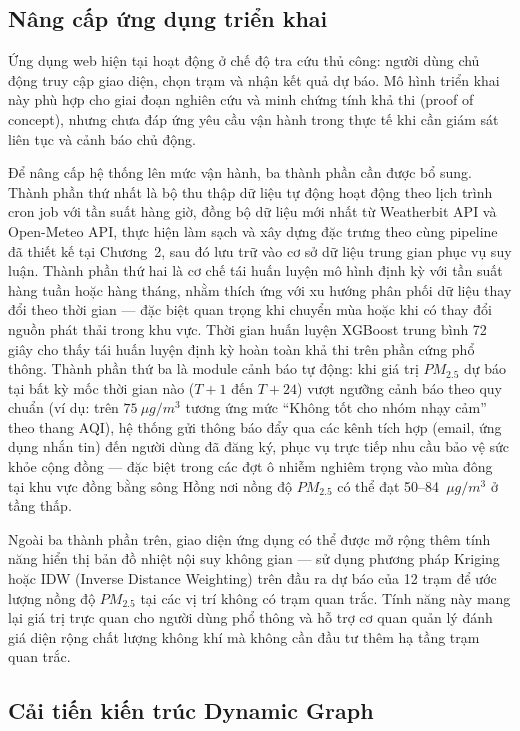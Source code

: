 \subsection{Nâng cấp ứng dụng triển khai}

Ứng dụng web hiện tại hoạt động ở chế độ tra cứu thủ công: người dùng chủ động truy cập giao diện, chọn trạm và nhận kết quả dự báo. Mô hình triển khai này phù hợp cho giai đoạn nghiên cứu và minh chứng tính khả thi (proof of concept), nhưng chưa đáp ứng yêu cầu vận hành trong thực tế khi cần giám sát liên tục và cảnh báo chủ động.

Để nâng cấp hệ thống lên mức vận hành, ba thành phần cần được bổ sung. Thành phần thứ nhất là bộ thu thập dữ liệu tự động hoạt động theo lịch trình cron job với tần suất hàng giờ, đồng bộ dữ liệu mới nhất từ Weatherbit API và Open-Meteo API, thực hiện làm sạch và xây dựng đặc trưng theo cùng pipeline đã thiết kế tại Chương~2, sau đó lưu trữ vào cơ sở dữ liệu trung gian phục vụ suy luận. Thành phần thứ hai là cơ chế tái huấn luyện mô hình định kỳ với tần suất hàng tuần hoặc hàng tháng, nhằm thích ứng với xu hướng phân phối dữ liệu thay đổi theo thời gian --- đặc biệt quan trọng khi chuyển mùa hoặc khi có thay đổi nguồn phát thải trong khu vực. Thời gian huấn luyện XGBoost trung bình 72 giây cho thấy tái huấn luyện định kỳ hoàn toàn khả thi trên phần cứng phổ thông. Thành phần thứ ba là module cảnh báo tự động: khi giá trị $PM_{2.5}$ dự báo tại bất kỳ mốc thời gian nào ($T{+}1$ đến $T{+}24$) vượt ngưỡng cảnh báo theo quy chuẩn (ví dụ: trên $75~\mu g/m^3$ tương ứng mức ``Không tốt cho nhóm nhạy cảm'' theo thang AQI), hệ thống gửi thông báo đẩy qua các kênh tích hợp (email, ứng dụng nhắn tin) đến người dùng đã đăng ký, phục vụ trực tiếp nhu cầu bảo vệ sức khỏe cộng đồng --- đặc biệt trong các đợt ô nhiễm nghiêm trọng vào mùa đông tại khu vực đồng bằng sông Hồng nơi nồng độ $PM_{2.5}$ có thể đạt 50--84~$\mu g/m^3$ ở tầng thấp.

Ngoài ba thành phần trên, giao diện ứng dụng có thể được mở rộng thêm tính năng hiển thị bản đồ nhiệt nội suy không gian --- sử dụng phương pháp Kriging hoặc IDW (Inverse Distance Weighting) trên đầu ra dự báo của 12 trạm để ước lượng nồng độ $PM_{2.5}$ tại các vị trí không có trạm quan trắc. Tính năng này mang lại giá trị trực quan cho người dùng phổ thông và hỗ trợ cơ quan quản lý đánh giá diện rộng chất lượng không khí mà không cần đầu tư thêm hạ tầng trạm quan trắc.

\subsection{Cải tiến kiến trúc Dynamic Graph}

